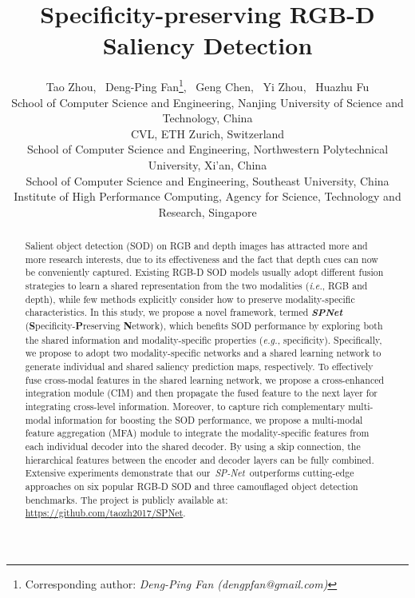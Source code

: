 \documentclass[10pt,twocolumn,letterpaper]{article}
\def\ie{\emph{i.e.}}
\def\eg{\emph{e.g.}}
\def\ours{\emph{SP-Net}}
\begin{document}
\title{Specificity-preserving RGB-D Saliency Detection}



\author{Tao Zhou, ~Deng-Ping Fan\thanks{Corresponding author: \emph{Deng-Ping Fan (dengpfan@gmail.com)}}, ~Geng Chen, ~Yi Zhou, ~Huazhu Fu\\ 	
	   \normalsize{School of Computer Science and Engineering, Nanjing University of Science and Technology, China}\\
	   \normalsize{CVL, ETH Zurich, Switzerland}\\
	   \normalsize{School of Computer Science and Engineering, Northwestern Polytechnical University, Xi'an, China} \\
	   \normalsize{School of Computer Science and Engineering, Southeast University, China}\\
	   \normalsize{Institute of High Performance Computing, Agency for Science, Technology and Research, Singapore}\\
}




\maketitle
\ificcvfinal\thispagestyle{empty}\fi

\begin{abstract}

Salient object detection (SOD) on RGB and depth images has attracted more and more research interests, due to its effectiveness and the fact that depth cues can now be conveniently captured. Existing RGB-D SOD models usually adopt different fusion strategies to learn a shared representation from the two modalities (\ie, RGB and depth), while few methods explicitly consider how to preserve modality-specific characteristics. In this study, we propose a novel framework, termed \emph{\textbf{SPNet}} (\textbf{S}pecificity-\textbf{P}reserving \textbf{N}etwork), which benefits SOD performance by exploring both the shared information and modality-specific properties (\eg, specificity). Specifically, we propose to adopt two modality-specific networks and a shared learning network to generate individual and shared saliency prediction maps, respectively. To effectively fuse cross-modal features in the shared learning network, we propose a cross-enhanced integration module (CIM) and then propagate the fused feature to the next layer for integrating cross-level information. Moreover, to capture rich complementary multi-modal information for boosting the SOD performance, we propose a multi-modal feature aggregation (MFA) module to integrate the modality-specific features from each individual decoder into the shared decoder. By using a skip connection, the hierarchical features between the encoder and decoder layers can be fully combined. Extensive experiments demonstrate that our~\ours~outperforms cutting-edge approaches on six popular RGB-D SOD and three camouflaged object detection benchmarks. The project is publicly available at: \url{https://github.com/taozh2017/SPNet}. 

\end{abstract}
\end{document}
